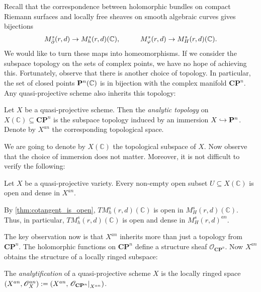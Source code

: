 \documentclass[12pt]{ociamthesis}  %
\begin{document}
Recall that the correspondence between holomorphic bundles on
compact Riemann surfaces and locally free sheaves on smooth algebraic
curves gives bijections
\begin{align*}
  M^s_{{\bar{\partial}}}(r,d) \to M^s_h(r,d)(\mathbb C), \hspace{1cm}
  M^s_{\varphi}(r,d) \to M^s_H(r,d)(\mathbb C).
\end{align*}
We would like to turn these maps into homeomorphisms. If we consider
the subspace topology on the sets of complex points, we have no hope
of achieving this. Fortunately, observe that there is another choice of
topology. In particular, the set of closed points $\mathbf{P}^{n}_{}(\mathbb C)$
is in bijection with the complex manifold $\mathbf{CP}^n$. Any quasi-projective
scheme also inherits this topology:

\begin{definition}
  Let $X$ be a quasi-projective scheme. Then the \emph{analytic topology} on
  $X(\mathbb C)\subseteq \mathbf{CP}^n$ is the subspace topology induced by an
  immersion $X\hookrightarrow \mathbf P^n$. Denote by $X^{an}$ the corresponding
  topological space.
\end{definition}

We are going to denote by $X(\mathbb C)$ the topological
subspace of $X$. Now observe that the choice of immersion does not matter.
Moreover, it is not difficult to verify the following:

\begin{lemma}
  Let $X$ be a quasi-projective variety.  Every non-empty open subset
  $U\subseteq X(\mathbb C)$ is open and dense in $X^{an}$.
\end{lemma}

\begin{example}
  By \ref{thm:cotangent_is_open}, $TM_h^s(r,d)(\mathbb C)$ is open in
  $M_H^s(r,d)(\mathbb C)$. Thus, in particular, $TM_h^s(r,d)(\mathbb C)$
  is open and dense in $M^s_H(r,d)^{an}$.
\end{example}

The key observation now is that $X^{an}$ inherits more than just a
topology from $\mathbf{CP}^n$. The holomorphic functions on $\mathbf{CP}^n$
define a structure sheaf $\mathscr O_{\mathbf{CP}^n}$. Now $X^{an}$
obtains the structure of a locally ringed subspace:

\begin{definition}
  The \emph{analytification} of a quasi-projective scheme $X$
  is the locally ringed space
  $(X^{an},\mathscr O_X^{an}) := (X^{an},\left.{\mathscr O_{\mathbf{CP}^n}}\right\vert_{X^{an}})$.
\end{definition}
\end{document}
